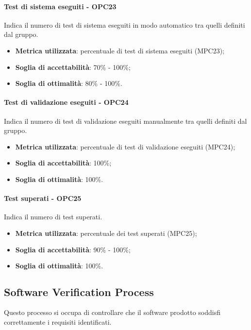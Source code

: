 \documentclass[PdQ.tex]{subfiles}
\begin{document}
			\paragraph{Test di sistema eseguiti - OPC23}
				Indica il numero di test di sistema eseguiti in modo automatico tra quelli definiti dal gruppo.
				\begin{itemize}
					\item \textbf{Metrica utilizzata}: percentuale di test di sistema eseguiti (MPC23);
					\item \textbf{Soglia di accettabilità}: 70\% - 100\%;
					\item \textbf{Soglia di ottimalità}: 80\% - 100\%.
				\end{itemize}
				
			\paragraph{Test di validazione eseguiti - OPC24}
				Indica il numero di test di validazione eseguiti manualmente tra quelli definiti dal gruppo.
				\begin{itemize}
					\item \textbf{Metrica utilizzata}: percentuale di test di validazione eseguiti (MPC24);
					\item \textbf{Soglia di accettabilità}: 100\%;
					\item \textbf{Soglia di ottimalità}: 100\%.
				\end{itemize}
				
			\paragraph{Test superati - OPC25}
				Indica il numero di test superati.
				\begin{itemize}
					\item \textbf{Metrica utilizzata}: percentuale dei test superati (MPC25);
					\item \textbf{Soglia di accettabilità}: 90\% - 100\%;
					\item \textbf{Soglia di ottimalità}: 100\%.
				\end{itemize}
					
	\subsection{Software Verification Process}
		Questo processo si occupa di controllare che il software prodotto soddisfi correttamente i requisiti identificati.
		
\end{document}
